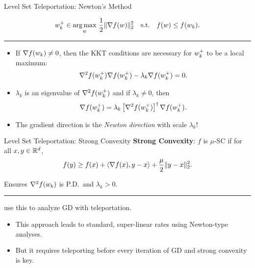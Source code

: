 \documentclass[usenames,dvipsnames,mathserif,notheorems]{beamer}
\newcommand{\horizontalrule}{
	{
			\vspace{-0.5em}
			\center \rule{\textwidth}{0.1em}
			\vspace{-0.2em}
		}
}
\newcommand{\bad}[1]{\textcolor{bad}{#1}}
\newcommand{\good}[1]{\textcolor{good}{#1}}
\begin{document}
\begin{frame}{Level Set Teleportation: Newton's Method}

    \[
        w_k^+ \in \mathop{\rm arg\,max}_w \, \frac 1 2 \|\nabla f(w)\|^2_2  \quad \text{s.t.} \quad f(w) \leq f(w_k).
    \]

    \pause
    \horizontalrule

    \begin{itemize}

        \item If \( \nabla f(w_k) \neq 0 \), then the KKT conditions are
              \good{necessary} for \( w_k^+ \) to be
              a local maximum:
              \[
                  \nabla^2 f(w_k^+) \nabla f(w_k^+) - \lambda_k \nabla f(w_k^+) = 0.
              \]
              \pause
              \vspace{-3ex}

        \item \( \lambda_k \) is an eigenvalue of \( \nabla^2 f(w_k^+) \) and
              if \( \lambda_k \neq 0 \), then
              \[
                  \nabla f(w_k^+) = \lambda_k \left[\nabla^2 f(w_k^+)\right]^{\dagger} \nabla f(w_k^+).
              \]
              \pause

        \item The gradient direction is the \emph{Newton direction} with scale \( \lambda_k \)!

    \end{itemize}
\end{frame}

\begin{frame}{Level Set Teleportation: Strong Convexity}
    \textbf{Strong Convexity}: \( f \) is \( \mu \)-SC if for all \( x,y \in \mathbb{R}^d \),
    \[
        f(y) \geq f(x) + \left\langle\nabla f(x), y - x\right\rangle + \frac{\mu}{2} \|y - x\|_2^2.
    \]
    \pause
    \vspace{-2ex}

    Ensures \( \nabla^2 f(w_k) \) is P.D.\ and \( \lambda_k > 0 \).
    \pause
    \horizontalrule

    \citet{zhao2023improving} use this to analyze GD with teleportation.
    \pause
    \vspace{1em}
    \begin{itemize}
        \item This approach leads to standard, \good{super-linear} rates using
              Newton-type analyses.

              \pause
              \vspace{1em}
        \item But it requires teleporting before \bad{every iteration} of GD
              and \bad{strong convexity} is key.
    \end{itemize}

\end{frame}
\end{document}

